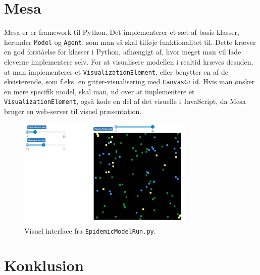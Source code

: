 \documentclass{article}
\begin{document}
\section{Mesa}
Mesa er er framework til Python. Det implementerer et sæt af basis-klasser, herunder \texttt{Model} og \texttt{Agent}, som man så skal tilføje funktionalitet til. Dette kræver en god forståelse for klasser i Python, afhængigt af, hvor meget man vil lade eleverne implementere selv. For at visualisere modellen i realtid kræves desuden, at man implementerer et \texttt{VisualizationElement}, eller benytter en af de eksisterende, som f.eks. en gitter-visualisering med \texttt{CanvasGrid}. Hvis man ønsker en mere specifik model, skal man, ud over at implementere et \texttt{VisualizationElement}, også kode en del af det visuelle i JavaScript, da Mesa bruger en web-server til visuel præsentation.
\begin{figure}[H]
  \centering
  \includegraphics[width=0.75\textwidth]{epidemic_mesa.png}
  \caption{Visuel interface fra \texttt{EpidemicModelRun.py}.}
\end{figure}
\section{Konklusion}
\end{document}

